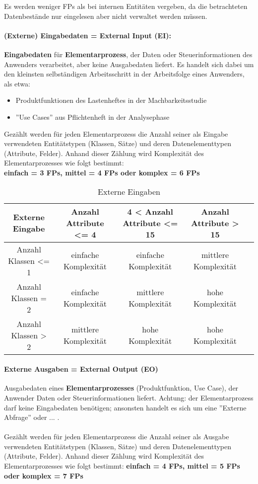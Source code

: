 Es werden weniger FPs als bei internen Entitäten vergeben, da die betrachteten Datenbestände nur eingelesen aber nicht verwaltet werden müssen.

\paragraph{(Externe) Eingabedaten = External Input (EI):}

\textbf{Eingabedaten} für \textbf{Elementarprozess}, der Daten oder Steuerinformationen des Anwenders verarbeitet, aber keine Ausgabedaten liefert. Es handelt sich dabei um den kleinsten selbständigen Arbeitsschritt in der Arbeitsfolge eines Anwenders, als etwa:
\begin{itemize}
	\item Produktfunktionen des Lastenheftes in der Machbarkeitsstudie
	\item ''Use Cases'' aus Pflichtenheft in der Analysephase
\end{itemize}
Gezählt werden für jeden Elementarprozess die Anzahl seiner als Eingabe verwendeten Entitätstypen (Klassen, Sätze) und deren Datenelementtypen (Attribute, Felder). Anhand dieser Zählung wird Komplexität des Elementarprozesses wie folgt bestimmt: \\
\textbf{einfach = 3 FPs, mittel = 4 FPs oder komplex = 6 FPs}

\begin{table}
	\centering
	\begin{tabular}{||c | c | c | c | c ||} 
		\hline
		\textbf{Externe Eingabe} & Anzahl Attribute <= 4 & 4 < Anzahl Attribute <= 15 & Anzahl Attribute > 15 \\  
		\hline\hline
		Anzahl Klassen <= 1 & einfache Komplexität & einfache Komplexität & mittlere Komplexität \\ 
		\hline
		Anzahl Klassen = 2 & einfache Komplexität & mittlere Komplexität & hohe Komplexität \\ 
		\hline
		Anzahl Klassen > 2 & mittlere Komplexität & hohe Komplexität & hohe Komplexität \\ 
		\hline
	\end{tabular}
	\caption{Externe Eingaben}
\end{table}

\paragraph{Externe Ausgaben = External Output (EO)}
Ausgabedaten eines \textbf{Elementarprozesses} (Produktfunktion, Use Case), der Anwender Daten oder Steuerinformationen liefert. Achtung: der Elementarprozess darf keine Eingabedaten benötigen; ansonsten handelt es sich um eine ''Externe Abfrage'' oder ... .
\\
\\
Gezählt werden für jeden Elementarprozess die Anzahl seiner als Ausgabe verwendeten Entitätstypen (Klassen, Sätze) und deren Datenelementtypen (Attribute, Felder). Anhand dieser Zählung wird Komplexität des Elementarprozesses wie folgt bestimmt:
\textbf{einfach = 4 FPs, mittel = 5 FPs oder komplex = 7 FPs}

